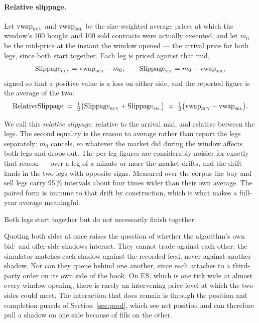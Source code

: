 \documentclass[11pt]{article}
\begin{document}
\paragraph{Relative slippage.} Let $\text{vwap}_{\textsc{buy}}$ and
$\text{vwap}_{\textsc{sel}}$ be the size-weighted average prices at which the
window's 100 bought and 100 sold contracts were actually executed, and let
$m_{0}$ be the mid-price at the instant the window opened --- the arrival price
for both legs, since both start together. Each leg is priced against that mid,
\begin{equation}
  \text{Slippage}_{\textsc{buy}} = \text{vwap}_{\textsc{buy}} - m_{0},
  \qquad
  \text{Slippage}_{\textsc{sel}} = m_{0} - \text{vwap}_{\textsc{sel}},
  \label{eq:slipleg}
\end{equation}
signed so that a positive value is a loss on either side, and the reported
figure is the average of the two:
\begin{equation}
  \text{RelativeSlippage} \;=\; \tfrac12\big(\text{Slippage}_{\textsc{buy}}
                                   + \text{Slippage}_{\textsc{sel}}\big)
                 \;=\; \tfrac12\big(\text{vwap}_{\textsc{buy}}
                                   - \text{vwap}_{\textsc{sel}}\big).
  \label{eq:slippage}
\end{equation}

We call this \emph{relative slippage}: relative to the arrival mid, and
relative between the legs. The second equality is the reason to average rather
than report the legs separately: $m_{0}$ cancels, so whatever the market did
during the window affects both legs and drops out. The per-leg figures are considerably noisier
for exactly that reason --- over a leg of a minute or more the market drifts, and
the drift lands in the two legs with opposite signs. Measured over the corpus the
buy and sell legs carry 95\,\% intervals about four times wider than their own
average. The paired form is immune to that drift by construction, which is what
makes a full-year average meaningful.

Both legs start together but do not necessarily finish together.

Quoting both sides at once raises the question of whether the algorithm's own
bid- and offer-side shadows interact. They cannot trade against each other: the
simulator matches each shadow against the recorded feed, never against another
shadow. Nor can they queue behind one another, since each attaches to a
third-party order on its own side of the book. On ES, which is one tick wide at almost every window
opening, there is rarely an intervening price level at which the two sides could
meet. The interaction that does remain is through the position
and completion guards of Section~\ref{sec:prod}, which see net position and can
therefore pull a shadow on one side because of fills on the other.
\end{document}
